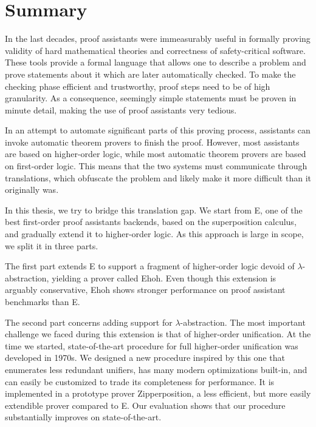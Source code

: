 \chapter*{Summary}

In the last decades, proof assistants were immeasurably useful in formally
proving validity of hard mathematical theories and correctness of
safety-critical software. These tools provide a formal language that allows one
to describe a problem and prove statements about it which are later
automatically checked. To make the checking phase efficient and trustworthy,
proof steps need to be of high granularity. As a consequence, seemingly
simple statements must be proven in minute detail, making the use of proof
assistants very tedious.

In an attempt to automate significant parts of this proving process, assistants
can invoke automatic theorem provers to finish the proof. However, most
assistants are based on higher-order logic, while most automatic theorem provers
are based on first-order logic. This means that the two systems must communicate
through translations, which obfuscate the problem and likely make it more
difficult than it originally was.

In this thesis, we try to bridge this translation gap. We start from E, one of the best
first-order proof assistants backends, based on the superposition calculus, and
gradually extend it to higher-order logic. As this approach is large in scope,
we split it in three parts.

The first part extends E to support a fragment of higher-order logic devoid of
$\lambda$-abstra\-ction, yielding a prover called Ehoh. Even though this extension
is arguably conservative, Ehoh shows stronger performance on proof assistant
benchmarks than E.

The second part concerns adding support for $\lambda$-abstraction. The most
important challenge we faced during this extension is that of higher-order
unification. At the time we started, state-of-the-art procedure
for full higher-order unification was developed in 1970s. We designed a new
procedure inspired by this one that enumerates less redundant unifiers, has many
modern optimizations built-in, and can easily be customized to trade its
completeness for performance. It is implemented in a
prototype prover Zipperposition, a less efficient, but more easily extendible
prover compared to E. Our evaluation shows that our
procedure substantially improves on state-of-the-art.

